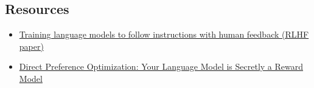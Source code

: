 \documentclass[12pt]{article}
\begin{document}
\subsection{Resources}
\begin{itemize}
    \item \href{https://arxiv.org/pdf/2203.02155}{Training language models to follow instructions with human feedback (RLHF paper)}

    \item \href{https://arxiv.org/pdf/2305.18290}{Direct Preference Optimization: Your Language Model is Secretly a Reward Model}
\end{itemize}
\end{document}
